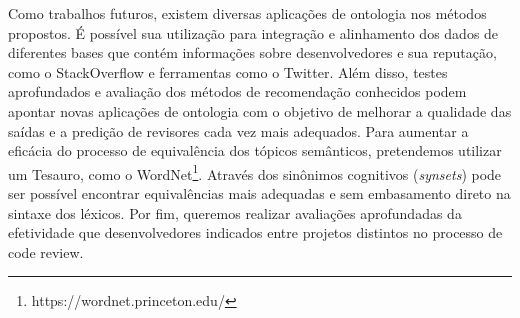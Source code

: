 \documentclass[sigconf]{acmart}
\begin{document}
Como trabalhos futuros, existem diversas aplicações de ontologia nos métodos propostos. É possível sua utilização para integração e alinhamento dos dados de diferentes bases que contém informações sobre desenvolvedores e sua reputação, como o StackOverflow e ferramentas como o Twitter. Além disso, testes aprofundados e avaliação dos métodos de recomendação conhecidos podem apontar novas aplicações de ontologia com o objetivo de melhorar a qualidade das saídas e a predição de revisores cada vez mais adequados. Para aumentar a eficácia do processo de equivalência dos tópicos semânticos, pretendemos utilizar um Tesauro, como o WordNet\footnote{https://wordnet.princeton.edu/}. Através dos sinônimos cognitivos (\textit{synsets}) pode ser possível encontrar equivalências mais adequadas e sem embasamento direto na sintaxe dos léxicos. Por fim, queremos realizar avaliações aprofundadas da efetividade que desenvolvedores indicados entre projetos distintos no processo de code review.



\end{document}
